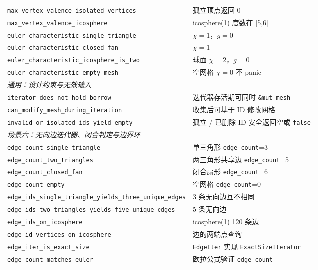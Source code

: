 \documentclass[11pt,a4paper]{article}
\begin{document}
{\begin{longtable}{@{}ll@{}}
  \texttt{max\_vertex\_valence\_isolated\_vertices}      & 孤立顶点返回 0 \\
  \texttt{max\_vertex\_valence\_icosphere}               & icosphere(1) 度数在 [5,6] \\
  \texttt{euler\_characteristic\_single\_triangle}       & $\chi = 1$，$g = 0$ \\
  \texttt{euler\_characteristic\_closed\_fan}            & $\chi = 1$ \\
  \texttt{euler\_characteristic\_icosphere\_is\_two}     & 球面 $\chi = 2$，$g = 0$ \\
  \texttt{euler\_characteristic\_empty\_mesh}            & 空网格 $\chi = 0$ 不 panic \\
  \midrule
  \multicolumn{2}{l}{\textit{通用：设计约束与无效输入}} \\
  \texttt{iterator\_does\_not\_hold\_borrow}    & 迭代器存活期可同时 \texttt{\&mut mesh} \\
  \texttt{can\_modify\_mesh\_during\_iteration} & 收集后可基于 ID 修改网格 \\
  \texttt{invalid\_or\_isolated\_ids\_yield\_empty} & 孤立 / 已删除 ID 安全返回空或 \texttt{false} \\
  \midrule
  \multicolumn{2}{l}{\textit{场景六：无向边迭代器、闭合判定与边界环}} \\
  \texttt{edge\_count\_single\_triangle}                       & 单三角形 \texttt{edge\_count}=3 \\
  \texttt{edge\_count\_two\_triangles}                         & 两三角形共享边 \texttt{edge\_count}=5 \\
  \texttt{edge\_count\_closed\_fan}                            & 闭合扇形 \texttt{edge\_count}=6 \\
  \texttt{edge\_count\_empty}                                 & 空网格 \texttt{edge\_count}=0 \\
  \texttt{edge\_ids\_single\_triangle\_yields\_three\_unique\_edges} & 3 条无向边互不相同 \\
  \texttt{edge\_ids\_two\_triangles\_yields\_five\_unique\_edges}    & 5 条无向边 \\
  \texttt{edge\_ids\_on\_icosphere}                            & icosphere(1) 120 条边 \\
  \texttt{edge\_id\_vertices\_on\_icosphere}                   & 边的两端点查询 \\
  \texttt{edge\_iter\_is\_exact\_size}                         & \texttt{EdgeIter} 实现 \texttt{ExactSizeIterator} \\
  \texttt{edge\_count\_matches\_euler}                         & 欧拉公式验证 \texttt{edge\_count} \\

\end{longtable}}
\end{document}
